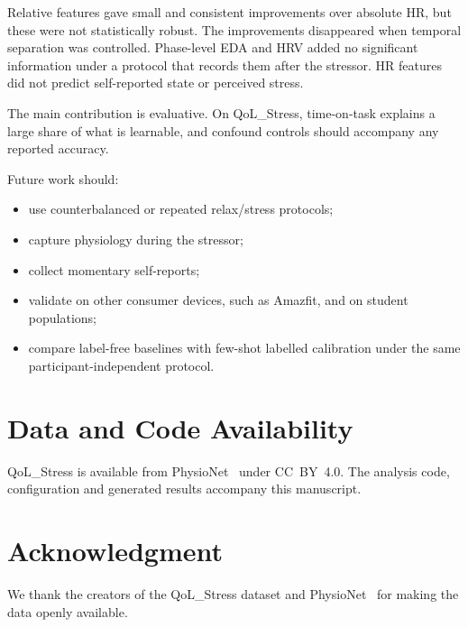 \documentclass[conference]{IEEEtran}
\begin{document}
Relative features gave small and consistent improvements over absolute HR, but these were not statistically robust. The improvements disappeared when temporal separation was controlled. Phase-level EDA and HRV added no significant information under a protocol that records them after the stressor. HR features did not predict self-reported state or perceived stress.

The main contribution is evaluative. On QoL\_Stress, time-on-task explains a large share of what is learnable, and confound controls should accompany any reported accuracy.

Future work should:
\begin{itemize}
\item use counterbalanced or repeated relax/stress protocols;
\item capture physiology during the stressor;
\item collect momentary self-reports;
\item validate on other consumer devices, such as Amazfit, and on student populations;
\item compare label-free baselines with few-shot labelled calibration under the same participant-independent protocol.
\end{itemize}

\section*{Data and Code Availability}
QoL\_Stress is available from PhysioNet~\cite{calvo2026qolstress} under CC~BY~4.0. The analysis code, configuration and generated results accompany this manuscript.

\section*{Acknowledgment}
We thank the creators of the QoL\_Stress dataset and PhysioNet~\cite{pollard2026physionet} for making the data openly available.

\balance


\end{document}

